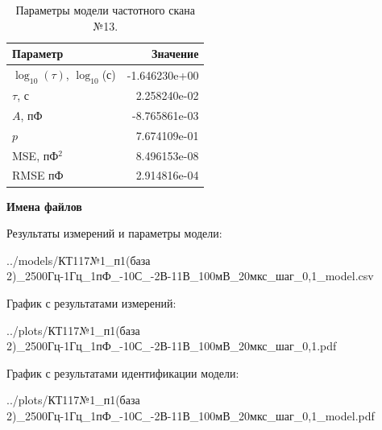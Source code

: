 \begin{table}[!ht]
    \centering
    \caption{Параметры модели частотного скана №13.}
    \begin{tabular}{|l|r|}
        \hline
        Параметр                                       & Значение                  \\ \hline
        $\log_{10}(\tau)$, $\log_{10}$(с)              & -1.646230e+00             \\ \hline
        $\tau$, с                                      & 2.258240e-02              \\ \hline
        $A$, пФ                                        & -8.765861e-03             \\ \hline
        $p$                                            & 7.674109e-01              \\ \hline
        MSE, пФ$^2$                                    & 8.496153e-08              \\ \hline
        RMSE пФ                                        & 2.914816e-04              \\ \hline
    \end{tabular}
    \label{table:frequency_scan_model_13}
\end{table}

\textbf{Имена файлов}

Результаты измерений и параметры модели:

\scriptsize../models/КТ117№1\_п1(база 2)\_2500Гц-1Гц\_1пФ\_-10С\_-2В-11В\_100мВ\_20мкс\_шаг\_0,1\_model.csv
\normalsize

График с результатами измерений:

\scriptsize../plots/КТ117№1\_п1(база 2)\_2500Гц-1Гц\_1пФ\_-10С\_-2В-11В\_100мВ\_20мкс\_шаг\_0,1.pdf
\normalsize

График с результатами идентификации модели:

\scriptsize../plots/КТ117№1\_п1(база 2)\_2500Гц-1Гц\_1пФ\_-10С\_-2В-11В\_100мВ\_20мкс\_шаг\_0,1\_model.pdf
\normalsize

